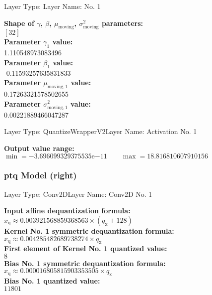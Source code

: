 {\begin{layerbox}{Layer Type: }{Layer Name:  No. 1}
  \begin{center}
    \textbf{Shape of $\gamma$, $\beta$, $\mu_{\text{moving}}$, $\sigma^2_{\text{moving}}$ parameters:} \\[2pt]
    $[32]$ \\[6pt]
    \textbf{Parameter $\gamma_1$ value:} \\[2pt]
    1.110548973083496 \\[6pt]
    \textbf{Parameter $\beta_1$ value:} \\[2pt]
    -0.11593257635831833 \\[6pt]
    \textbf{Parameter $\mu_{\text{moving},1}$ value:} \\[2pt]
    0.17263321578502655 \\[6pt]
    \textbf{Parameter $\sigma^2_{\text{moving},1}$ value:} \\[2pt]
    0.00221889466047287
  \end{center}
\end{layerbox}


\begin{layerbox}{Layer Type: QuantizeWrapperV2}{Layer Name: Activation No. 1}
  \begin{center}
    \textbf{Output value range:} \\[2pt]
    $\min = -3.696099329375535 \mathrm{e}{-11} \quad\quad \max = 18.816810607910156$
  \end{center}
\end{layerbox}

\bigskip
\subsubsection*{\gls{ptq} Model (right)}

\begin{layerbox}{Layer Type: Conv2D}{Layer Name: Conv2D No. 1}
  \begin{center}
    \textbf{Input affine dequantization formula:} \\[2pt]
    $x_{\text{q}} \approx 0.003921568859368563 \times (q_{\text{x}} + 128)$ \\[6pt]
    \textbf{Kernel No. 1 symmetric dequantization formula:} \\[2pt]
    $x_{\text{q}} \approx 0.004285482689738274 \times q_{\text{x}}$ \\[6pt]
    \textbf{First element of Kernel No. 1 quantized value:} \\[2pt]
    $8$ \\[6pt]
    \textbf{Bias No. 1 symmetric dequantization formula:} \\[2pt]
    $x_{\text{q}} \approx 0.000016805815903353505 \times q_{\text{x}}$ \\[6pt]
    \textbf{Bias No. 1 quantized value:} \\[2pt]
    $11801$ \\[6pt]
  \end{center}
\end{layerbox}

}
